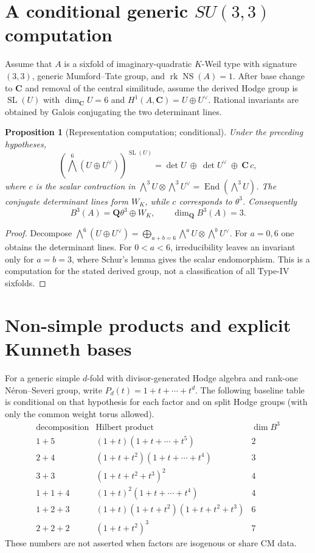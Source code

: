 \documentclass[11pt]{article}
\newtheorem{proposition}[theorem]{Proposition}
\newcommand{\C}{\mathbf C}
\newcommand{\Q}{\mathbf Q}
\newcommand{\B}{B}
\newcommand{\NS}{\operatorname{NS}}
\newcommand{\End}{\operatorname{End}}
\newcommand{\rk}{\operatorname{rk}}
\begin{document}
\section{A conditional generic $SU(3,3)$ computation}
Assume that $A$ is a sixfold of imaginary-quadratic $K$-Weil type with signature $(3,3)$, generic Mumford--Tate group, and $\rk\NS(A)=1$.  After base change to $\C$ and removal of the central similitude, assume the derived Hodge group is $\operatorname{SL}(U)$ with $\dim_\C U=6$ and
$H^1(A,\C)=U\oplus U^\vee$.  Rational invariants are obtained by Galois conjugating the two determinant lines.

\begin{proposition}[Representation computation; conditional]
Under the preceding hypotheses,
\[
\left(\bigwedge^6(U\oplus U^\vee)\right)^{\operatorname{SL}(U)}
 =\det U\ \oplus\ \det U^\vee\ \oplus\ \C\,c,
\]
where $c$ is the scalar contraction in
$\bigwedge^3U\otimes\bigwedge^3U^\vee=\End(\bigwedge^3U)$.  The conjugate determinant lines form $W_K$, while $c$ corresponds to $\theta^3$.  Consequently
\[
 \B^3(A)=\Q\theta^3\oplus W_K,\qquad \dim_{\Q}\B^3(A)=3.
\]
\end{proposition}
\begin{proof}
Decompose $\bigwedge^6(U\oplus U^\vee)=\bigoplus_{a+b=6}\bigwedge^aU\otimes\bigwedge^bU^\vee$.  For $a=0,6$ one obtains the determinant lines.  For $0<a<6$, irreducibility leaves an invariant only for $a=b=3$, where Schur's lemma gives the scalar endomorphism.  This is a computation for the stated derived group, not a classification of all Type-IV sixfolds.
\end{proof}

\section{Non-simple products and explicit Kunneth bases}
For a generic simple $d$-fold with divisor-generated Hodge algebra and rank-one Néron--Severi group, write $P_d(t)=1+t+\cdots+t^d$.  The following baseline table is conditional on that hypothesis for each factor and on split Hodge groups (with only the common weight torus allowed).
\[
\begin{array}{c|c|c}
\text{decomposition}&\text{Hilbert product}&\dim\B^3\\ \hline
1+5&(1+t)(1+t+\cdots+t^5)&2\\
2+4&(1+t+t^2)(1+t+\cdots+t^4)&3\\
3+3&(1+t+t^2+t^3)^2&4\\
1+1+4&(1+t)^2(1+t+\cdots+t^4)&4\\
1+2+3&(1+t)(1+t+t^2)(1+t+t^2+t^3)&6\\
2+2+2&(1+t+t^2)^3&7
\end{array}
\]
These numbers are not asserted when factors are isogenous or share CM data.
\end{document}
